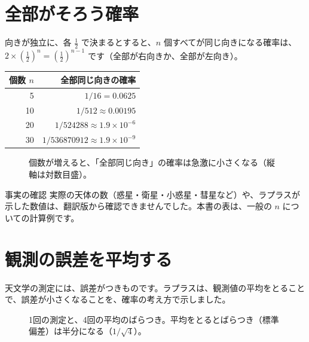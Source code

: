 \documentclass[a4paper,11pt,openany]{ltjsbook}
\begin{document}
\section{全部がそろう確率}

向きが独立に、各 $\frac12$ で決まるとすると、$n$ 個すべてが同じ向きになる確率は、$2\times\left(\frac12\right)^n=\left(\frac12\right)^{n-1}$ です（全部が右向きか、全部が左向き）。

\begin{center}
\begin{tabular}{rr}
\toprule
個数 $n$ & 全部同じ向きの確率\\
\midrule
5 & $1/16=0.0625$\\
10 & $1/512\approx0.00195$\\
20 & $1/524288\approx1.9\times10^{-6}$\\
30 & $1/536870912\approx1.9\times10^{-9}$\\
\bottomrule
\end{tabular}
\end{center}

\begin{figure}[htbp]
\centering
{}
\caption{個数が増えると、「全部同じ向き」の確率は急激に小さくなる（縦軸は対数目盛）。}
\end{figure}

\begin{notebox}{事実の確認}
実際の天体の数（惑星・衛星・小惑星・彗星など）や、ラプラスが示した数値は、翻訳版から確認できませんでした。本書の表は、一般の $n$ についての計算例です。
\end{notebox}

\section{観測の誤差を平均する}

天文学の測定には、誤差がつきものです。ラプラスは、観測値の平均をとることで、誤差が小さくなることを、確率の考え方で示しました。

\begin{figure}[htbp]
\centering
{}
\caption{1回の測定と、4回の平均のばらつき。平均をとるとばらつき（標準偏差）は半分になる（$1/\sqrt4$）。}
\end{figure}
\end{document}
